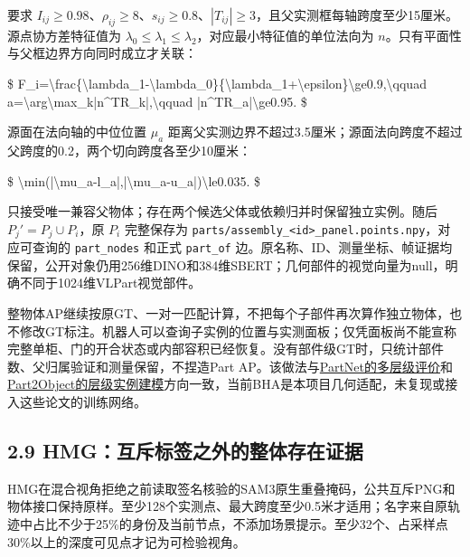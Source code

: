 \documentclass[UTF8,fontset=fandol]{ctexart}
\begin{document}
要求 $I_{ij}\ge0.98$、$\rho_{ij}\ge8$、$s_{ij}\ge0.8$、$|T_{ij}|\ge3$，且父实测框每轴跨度至少15厘米。源点协方差特征值为 $\lambda_0\le\lambda_1\le\lambda_2$，对应最小特征值的单位法向为 $n$。只有平面性与父框边界方向同时成立才关联：



\$
F\_i=\textbackslash{}frac\{\textbackslash{}lambda\_1-\textbackslash{}lambda\_0\}\{\textbackslash{}lambda\_1+\textbackslash{}epsilon\}\textbackslash{}ge0.9,\textbackslash{}qquad
a=\textbackslash{}arg\textbackslash{}max\_k|n\textasciicircum{}TR\_k|,\textbackslash{}qquad |n\textasciicircum{}TR\_a|\textbackslash{}ge0.95.
\$



源面在法向轴的中位位置 $\mu_a$ 距离父实测边界不超过3.5厘米；源面法向跨度不超过父跨度的0.2，两个切向跨度各至少10厘米：



\$
\textbackslash{}min(|\textbackslash{}mu\_a-l\_a|,|\textbackslash{}mu\_a-u\_a|)\textbackslash{}le0.035.
\$



只接受唯一兼容父物体；存在两个候选父体或依赖归并时保留独立实例。随后 $P_j'=P_j\cup P_i$，原 $P_i$ 完整保存为 \texttt{parts/\allowbreak{}assembly\_\allowbreak{}<id>\_\allowbreak{}panel.\allowbreak{}points.\allowbreak{}npy}，对应可查询的 \texttt{part\_\allowbreak{}nodes} 和正式 \texttt{part\_\allowbreak{}of} 边。原名称、ID、测量坐标、帧证据均保留，公开对象仍用256维DINO和384维SBERT；几何部件的视觉向量为null，明确不同于1024维VLPart视觉部件。



整物体AP继续按原GT、一对一匹配计算，不把每个子部件再次算作独立物体，也不修改GT标注。机器人可以查询子实例的位置与实测面板；仅凭面板尚不能宣称完整单柜、门的开合状态或内部容积已经恢复。没有部件级GT时，只统计部件数、父归属验证和测量保留，不捏造Part AP。该做法与\href{https://arxiv.org/abs/1812.02713}{PartNet的多层级评价}和\href{https://github.com/SooLab/Part2Object}{Part2Object的层级实例建模}方向一致，当前BHA是本项目几何适配，未复现或接入这些论文的训练网络。



\subsection*{2.9 HMG：互斥标签之外的整体存在证据}

HMG在混合视角拒绝之前读取签名核验的SAM3原生重叠掩码，公共互斥PNG和物体接口保持原样。至少128个实测点、最大跨度至少0.5米才适用；名字来自原轨迹中占比不少于25\%的身份及当前节点，不添加场景提示。至少32个、占采样点30\%以上的深度可见点才记为可检验视角。
\end{document}
